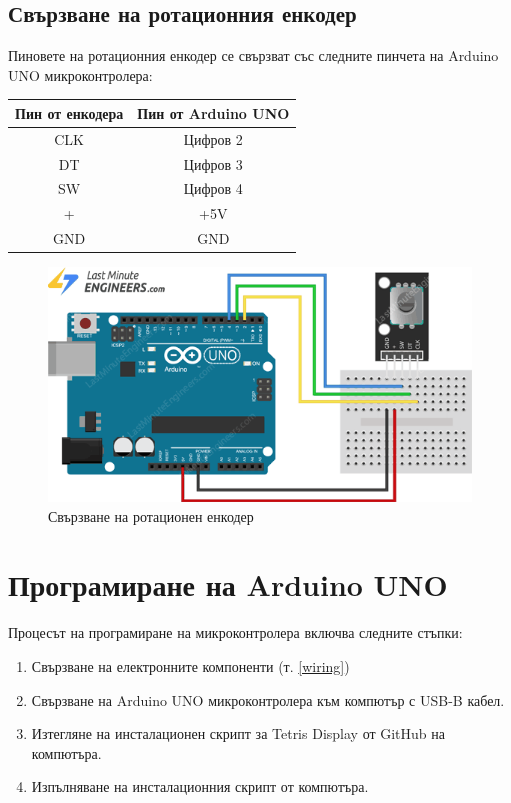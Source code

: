 \documentclass[titlepage, oneside, 12pt]{book}
\newcommand{\ard}{Arduino\texttrademark{}}
\begin{document}
\subsection{Свързване на ротационния енкодер}

Пиновете на ротационния енкодер се свързват със следните пинчета на \ard{} UNO микроконтролера:

\begin{center}
  \begin{tabular}{c|c}
    Пин от енкодера & Пин от \ard{} UNO \\ 
    \hline
    CLK & Цифров 2 \\  
    DT & Цифров 3 \\  
    SW & Цифров 4 \\
    + & +5V \\
    GND & GND
  \end{tabular}
\end{center}

\begin{figure}[h!]
    \centering
    \includegraphics[width=0.5\linewidth]{img/encoder_wiring.png}
    \caption{Свързване на ротационен енкодер}
\end{figure}

\section{Програмиране на \ard{} UNO}

Процесът на програмиране на микроконтролера включва следните стъпки:

\begin{enumerate}
  \item Свързване на електронните компоненти (т. \ref{wiring})
  \item Свързване на \ard{} UNO микроконтролера към компютър с USB-B кабел.
  \item Изтегляне на инсталационен скрипт за Tetris Display от GitHub \cite{github} на компютъра.
  \item Изпълняване на инсталационния скрипт от компютъра.
\end{enumerate}
\end{document}
